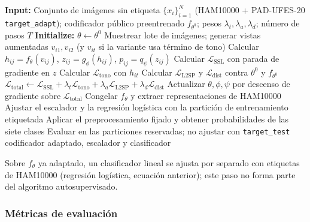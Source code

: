 \begin{algorithm}[htbp]
\fontsize{11}{13}\selectfont\singlespacing
\caption{Flujo del clasificador SSL: adaptación y clasificación}
\label{alg:simsiam-anclado}
\begin{algorithmic}[1]
\State \textbf{Input:} Conjunto de imágenes sin etiqueta $\{x_i\}_{i=1}^N$ (HAM10000 + PAD-UFES-20 \texttt{target\_adapt}); codificador público preentrenado $f_{\theta^0}$; pesos $\lambda_t,\lambda_a,\lambda_d$; número de pasos $T$
\State \textbf{Initialize:} $\theta\leftarrow\theta^0$ 
  \State Muestrear lote de imágenes; generar vistas aumentadas $v_{i1},v_{i2}$ (y $v_{it}$ si la variante usa término de tono) 
  \State Calcular $h_{ij}=f_\theta(v_{ij})$, $z_{ij}=g_\phi(h_{ij})$, $p_{ij}=q_\psi(z_{ij})$ 
  \State Calcular $\mathcal L_{\mathrm{SSL}}$ con parada de gradiente en $z$ 
    \State Calcular $\mathcal L_{\mathrm{tono}}$ con $h_{it}$ 
  \EndIf
  \State Calcular $\mathcal L_{\mathrm{L2SP}}$ y $\mathcal L_{\mathrm{dist}}$ contra $\theta^0$ y $f_{\theta^0}$ 
  \State $\mathcal L_{\mathrm{total}}\leftarrow \mathcal L_{\mathrm{SSL}}+\lambda_t\mathcal L_{\mathrm{tono}}+\lambda_a\mathcal L_{\mathrm{L2SP}}+\lambda_d\mathcal L_{\mathrm{dist}}$
  \State Actualizar $\theta,\phi,\psi$ por descenso de gradiente sobre $\mathcal L_{\mathrm{total}}$
\EndFor
\State Congelar $f_\theta$ y extraer representaciones de HAM10000
\State Ajustar el escalador y la regresión logística con la partición de entrenamiento etiquetada
\State Aplicar el preprocesamiento fijado y obtener probabilidades de las siete clases
\State Evaluar en las particiones reservadas; no ajustar con \texttt{target\_test}
\State \Return codificador adaptado, escalador y clasificador
\end{algorithmic}
\end{algorithm}

Sobre $f_\theta$ ya adaptado, un clasificador lineal se ajusta por separado con etiquetas de HAM10000 (regresión logística, ecuación anterior); este paso no forma parte del algoritmo autosupervisado.

\subsubsection{Métricas de evaluación}\label{sec:metricas-clasificacion}


